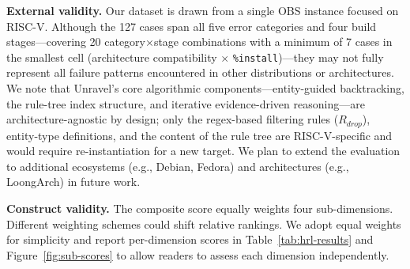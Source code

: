 \documentclass[sigconf,anonymous]{acmart}
\begin{document}
\textbf{External validity.} Our dataset is drawn from a single OBS instance focused on RISC-V. Although the 127 cases span all five error categories and four build stages---covering 20 category$\times$stage combinations with a minimum of 7 cases in the smallest cell (architecture compatibility $\times$ \texttt{\%install})---they may not fully represent all failure patterns encountered in other distributions or architectures. We note that Unravel's core algorithmic components---entity-guided backtracking, the rule-tree index structure, and iterative evidence-driven reasoning---are architecture-agnostic by design; only the regex-based filtering rules ($R_{drop}$), entity-type definitions, and the content of the rule tree are RISC-V-specific and would require re-instantiation for a new target. We plan to extend the evaluation to additional ecosystems (e.g., Debian, Fedora) and architectures (e.g., LoongArch) in future work.

\textbf{Construct validity.} The composite score equally weights four sub-dimensions. Different weighting schemes could shift relative rankings. We adopt equal weights for simplicity and report per-dimension scores in Table~\ref{tab:hrl-results} and Figure~\ref{fig:sub-scores} to allow readers to assess each dimension independently.




\end{document}
